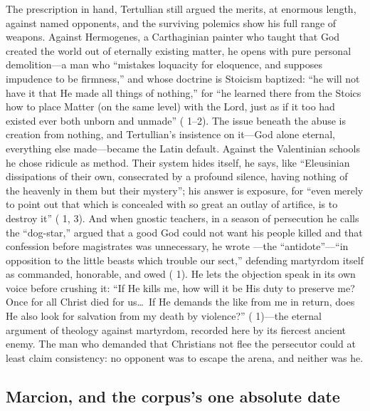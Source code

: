 The prescription in hand, Tertullian still argued the merits, at enormous
length, against named opponents, and the surviving polemics show his full
range of weapons. Against Hermogenes, a Carthaginian painter who taught that
God created the world out of eternally existing matter, he opens with pure
personal demolition---a man who ``mistakes loquacity for eloquence, and
supposes impudence to be firmness,'' and whose doctrine is Stoicism baptized:
``he will not have it that He made all things of nothing,'' for ``he learned
there from the Stoics how to place Matter (on the same level) with the Lord,
just as if it too had existed ever both unborn and unmade'' ( 1--2). The issue beneath the abuse is creation from nothing, and Tertullian's
insistence on it---God alone eternal, everything else made---became the Latin
default. Against the Valentinian schools he chose ridicule as method. Their
system hides itself, he says, like ``Eleusinian dissipations of their own,
consecrated by a profound silence, having nothing of the heavenly in them but
their mystery''; his answer is exposure, for ``even merely to point out that
which is concealed with so great an outlay of artifice, is to destroy it''
( 1, 3). And when gnostic teachers, in a
season of persecution he calls the ``dog-star,'' argued that a good God could
not want his people killed and that confession before magistrates was
unnecessary, he wrote ---the ``antidote''---``in opposition
to the little beasts which trouble our sect,'' defending martyrdom itself as
commanded, honorable, and owed ( 1). He lets the objection
speak in its own voice before crushing it: ``If He kills me, how will it be
His duty to preserve me? Once for all Christ died for us\ldots\ If He demands
the like from me in return, does He also look for salvation from my death by
violence?'' ( 1)---the eternal argument of theology against
martyrdom, recorded here by its fiercest ancient enemy. The man who demanded
that Christians not flee the persecutor could at least claim consistency: no
opponent was to escape the arena, and neither was he.

\subsection{Marcion, and the corpus's one absolute date}

